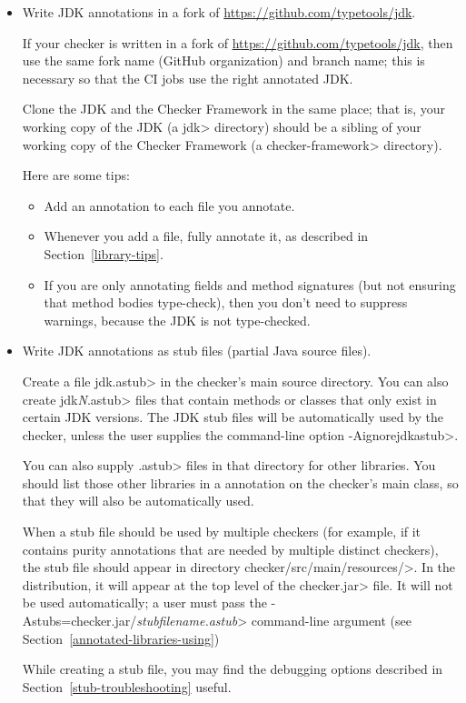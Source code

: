 \begin{itemize}
\item
  Write JDK annotations in a fork of
  \url{https://github.com/typetools/jdk}.

  If your checker is written in a fork of
  \url{https://github.com/typetools/jdk},
  then use the same fork name (GitHub organization) and branch name;
  this is necessary so that the CI jobs use the right annotated JDK.

  Clone the JDK and the Checker Framework in the same place; that is, your
  working copy of the JDK (a \<jdk> directory) should be a sibling of your
  working copy of the Checker Framework (a \<checker-framework> directory).

  Here are some tips:
  \begin{itemize}
  \item
    Add
    an  annotation to each file you annotate.
  \item
    Whenever you add a file, fully annotate it, as described in
    Section~\ref{library-tips}.
  \item
    If you are only annotating fields and method signatures (but not
    ensuring that method bodies type-check), then you don't need to suppress
    warnings, because the JDK is not type-checked.
  \end{itemize}

\item
  Write JDK annotations as stub files (partial Java source files).

  Create a file \<jdk.astub> in
the checker's main source directory.  You can also create \<jdk\emph{N}.astub> files that contain methods
or classes that only exist in certain JDK versions.
The JDK stub files will be automatically used by the
checker, unless the user supplies the command-line option \<-Aignorejdkastub>.

You can also supply \<.astub> files in that directory for other libraries.
You should list those other libraries in a
 annotation on the checker's main
class, so that they will also be automatically used.

When a stub file should be used by multiple checkers (for example, if it
contains purity annotations that are needed by multiple distinct checkers),
the stub file should appear in directory \<checker/src/main/resources/>.
In the distribution, it will appear at the top level of the \<checker.jar> file.
It will not be used automatically; a user must pass the
\<-Astubs=checker.jar/\emph{stubfilename.astub}> command-line argument
(see Section~\ref{annotated-libraries-using})

While creating a stub file, you may find the debugging options described in
Section~\ref{stub-troubleshooting} useful.

\end{itemize}



